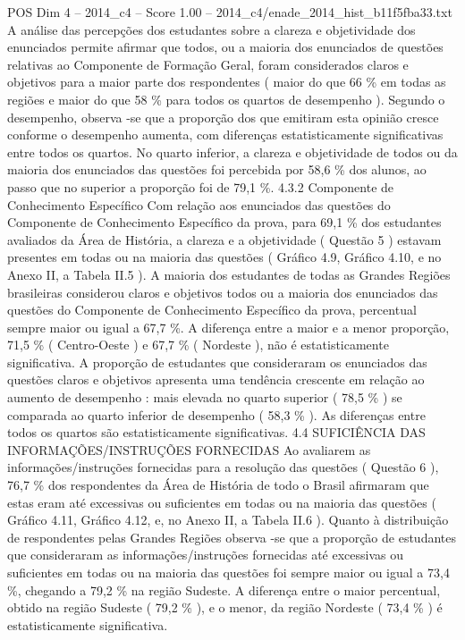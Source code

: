 \begin{textsample}{POS Dim 4 – 2014\_c4 – Score 1.00 – 2014\_c4/enade\_2014\_hist\_b11f5fba33.txt}
A análise das percepções dos estudantes sobre a clareza e objetividade dos enunciados permite afirmar que todos, ou a maioria dos enunciados de questões relativas ao Componente de Formação Geral, foram considerados claros e objetivos para a maior parte dos respondentes ( maior do que 66 \% em todas as regiões e maior do que 58 \% para todos os quartos de desempenho ).
Segundo o desempenho, observa -se que a proporção dos que emitiram esta opinião cresce conforme o desempenho aumenta, com diferenças estatisticamente significativas entre todos os quartos.
No quarto inferior, a clareza e objetividade de todos ou da maioria dos enunciados das questões foi percebida por 58,6 \% dos alunos, ao passo que no superior a proporção foi de 79,1 \%. 4.3.2 Componente de Conhecimento Específico Com relação aos enunciados das questões do Componente de Conhecimento Específico da prova, para 69,1 \% dos estudantes avaliados da Área de História, a clareza e a objetividade ( Questão 5 ) estavam presentes em todas ou na maioria das questões ( Gráfico 4.9, Gráfico 4.10, e no Anexo II, a Tabela II.5 ).
A maioria dos estudantes de todas as Grandes Regiões brasileiras considerou claros e objetivos todos ou a maioria dos enunciados das questões do Componente de Conhecimento Específico da prova, percentual sempre maior ou igual a 67,7 \%.
A diferença entre a maior e a menor proporção, 71,5 \% ( Centro-Oeste ) e 67,7 \% ( Nordeste ), não é estatisticamente significativa.
A proporção de estudantes que consideraram os enunciados das questões claros e objetivos apresenta uma tendência crescente em relação ao aumento de desempenho : mais elevada no quarto superior ( 78,5 \% ) se comparada ao quarto inferior de desempenho ( 58,3 \% ).
As diferenças entre todos os quartos são estatisticamente significativas. 4.4 SUFICIÊNCIA DAS INFORMAÇÕES/INSTRUÇÕES FORNECIDAS Ao avaliarem as informações/instruções fornecidas para a resolução das questões ( Questão 6 ), 76,7 \% dos respondentes da Área de História de todo o Brasil afirmaram que estas eram até excessivas ou suficientes em todas ou na maioria das questões ( Gráfico 4.11, Gráfico 4.12, e, no Anexo II, a Tabela II.6 ).
Quanto à distribuição de respondentes pelas Grandes Regiões observa -se que a proporção de estudantes que consideraram as informações/instruções fornecidas até excessivas ou suficientes em todas ou na maioria das questões foi sempre maior ou igual a 73,4 \%, chegando a 79,2 \% na região Sudeste.
A diferença entre o maior percentual, obtido na região Sudeste ( 79,2 \% ), e o menor, da região Nordeste ( 73,4 \% ) é estatisticamente significativa.

\end{textsample}

